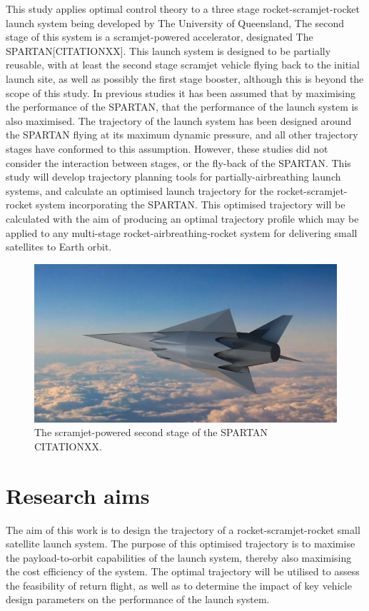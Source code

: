   	   This study applies optimal control theory to a three stage rocket-scramjet-rocket launch system being developed by The University of Queensland, The second stage of this system is a scramjet-powered accelerator, designated The SPARTAN[CITATIONXX]. This launch system is designed to be partially reusable, with at least the second stage scramjet vehicle flying back to the initial launch site, as well as possibly the first stage booster, although this is beyond the scope of this study. 
  	   In previous studies it has been assumed that by maximising the performance of the SPARTAN, that the performance of the launch system is also maximised. 
  	   The trajectory of the launch system has been designed around the SPARTAN flying at its
  	   maximum dynamic pressure, and all other trajectory stages have conformed to this assumption. However, these studies did not consider the interaction between stages, or the fly-back of the SPARTAN.
  	   This study will develop trajectory planning tools for partially-airbreathing launch systems, and calculate an optimised launch trajectory for the rocket-scramjet-rocket system incorporating the SPARTAN. This optimised trajectory will be calculated with the aim of producing an optimal
  	   trajectory profile which may be applied to any multi-stage rocket-airbreathing-rocket system for delivering small
  	   satellites to Earth orbit. 
  	   
  	  	\begin{figure}[ht]
  	  		\centering
  	  		\includegraphics[width=0.7\linewidth]{figures/1_introduction/project-spartan}
  	  		\caption{The scramjet-powered second stage of the SPARTAN CITATIONXX.}
  	  		\label{fig:project-spartan}
  	  	\end{figure}
  	  	

  \section{Research aims}

    The aim of this work is to design the trajectory of a rocket-scramjet-rocket small satellite launch system. The purpose of this optimised trajectory is to maximise the payload-to-orbit capabilities of the launch system, thereby also maximising the cost efficiency of the system. The optimal trajectory will be utilised to assess the feasibility of return flight, as well as to determine the impact of key vehicle design parameters on the performance of the launch system. 
 
